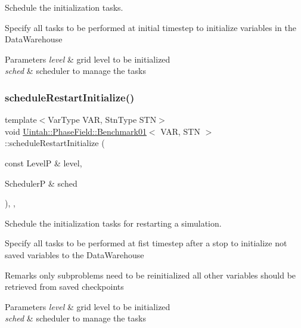 Schedule the initialization tasks. 

Specify all tasks to be performed at initial timestep to initialize variables in the Data\+Warehouse


\begin{DoxyParams}{Parameters}
{\em level} & grid level to be initialized \\
\hline
{\em sched} & scheduler to manage the tasks \\
\hline
\end{DoxyParams}
\mbox{\label{classUintah_1_1PhaseField_1_1Benchmark01_aefae5ede638d77a117caea0decd060e5}} 
\subsubsection{\texorpdfstring{schedule\+Restart\+Initialize()}{scheduleRestartInitialize()}}
{\footnotesize\ttfamily template$<$Var\+Type V\+AR, Stn\+Type S\+TN$>$ \\
void \hyperlink{classUintah_1_1PhaseField_1_1Benchmark01}{Uintah\+::\+Phase\+Field\+::\+Benchmark01}$<$ V\+AR, S\+TN $>$\+::schedule\+Restart\+Initialize (\begin{DoxyParamCaption}\item[{const LevelP \&}]{level,  }\item[{SchedulerP \&}]{sched }\end{DoxyParamCaption})\hspace{0.3cm}{\ttfamily [override]}, {\ttfamily [protected]}, {\ttfamily [virtual]}}



Schedule the initialization tasks for restarting a simulation. 

Specify all tasks to be performed at fist timestep after a stop to initialize not saved variables to the Data\+Warehouse

\begin{DoxyRemark}{Remarks}
only subproblems need to be reinitialized all other variables should be retrieved from saved checkpoints
\end{DoxyRemark}

\begin{DoxyParams}{Parameters}
{\em level} & grid level to be initialized \\
\hline
{\em sched} & scheduler to manage the tasks \\
\hline
\end{DoxyParams}
\mbox{\label{classUintah_1_1PhaseField_1_1Benchmark01_a0b0fa031276034614fca1d38d0790934}} 
